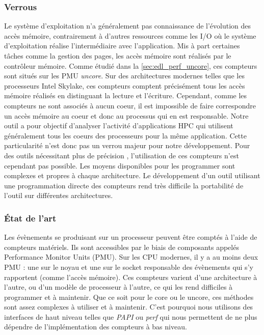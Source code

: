     \subsubsection{Verrous}
        
        
        Le système d'exploitation n'a généralement pas connaissance de l'évolution des accès mémoire, contrairement à d'autres ressources comme les I/O où le système d'exploitation réalise l'intermédiaire avec l'application. Mis à part certaines tâches comme la gestion des pages, les accès mémoire sont réalisés par le contrôleur mémoire. Comme étudié dans la \autoref{sec:edl_perf_uncore}, ces compteurs sont situés sur les PMU \textit{uncore}. Sur des architectures modernes telles que les processeurs Intel Skylake, ces compteurs comptent précisément tous les accès mémoire réalisés en distinguant la lecture et  l'écriture. Cependant, comme les compteurs ne sont associés à aucun coeur, il est impossible de faire correspondre un accès mémoire au coeur et donc au processus qui en est responsable. Notre outil a pour objectif d'analyser l'activité d'applications HPC qui utilisent généralement tous les coeurs des processeurs pour la même application. Cette particularité n'est donc pas un verrou majeur pour notre développement. Pour des outils nécessitant plus de précision \cite{Larysch2016}, l'utilisation de ces compteurs n'est cependant pas possible. Les moyens disponibles pour les programmer sont complexes et propres à chaque architecture. Le développement d'un outil utilisant une programmation directe des compteurs rend très difficile la portabilité de l'outil sur différentes architectures.
  
          
    \subsubsection{État de l'art}
    
        Les évènements se produisant sur un processeur peuvent être comptés à l'aide de compteurs matériels. Ils sont accessibles par le biais de composants appelés Performance Monitor Units (PMU). Sur les CPU modernes, il y a au moins deux PMU : une sur le noyau et une sur le socket responsable des évènements qui s'y rapportent (comme l'accès mémoire). Ces compteurs varient d'une architecture à l'autre, ou d'un modèle de processeur à l'autre, ce qui les rend difficiles à programmer et à maintenir. Que ce soit pour le core ou le uncore, ces méthodes sont assez complexes à utiliser et à maintenir. C'est pourquoi nous utilisons des interfaces de haut niveau telles que \textit{PAPI} ou \textit{perf} qui nous permettent de ne plus dépendre de l'implémentation des compteurs à bas niveau. 
        
